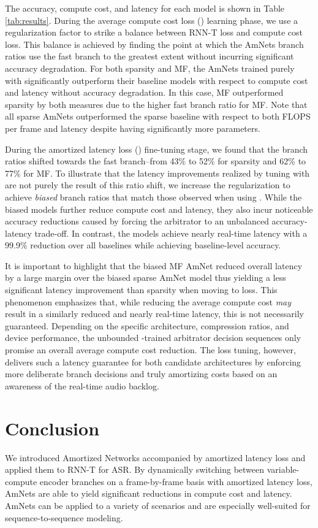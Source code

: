 \documentclass[a4paper]{article}
\begin{document}
The accuracy, compute cost, and latency for each model is shown in Table \ref{tab:results}. During the average compute cost loss () learning phase, we use a regularization factor to strike a balance between RNN-T loss and compute cost loss. This balance is achieved by finding the point at which the AmNets branch ratios use the fast branch to the greatest extent without incurring significant accuracy degradation. For both sparsity and MF, the AmNets trained purely with  significantly outperform their baseline models with respect to compute cost and latency without accuracy degradation. In this case, MF outperformed sparsity by both measures due to the higher fast branch ratio for MF. Note that all sparse AmNets outperformed the sparse baseline with respect to both FLOPS per frame and latency despite having significantly more parameters.

During the amortized latency loss () fine-tuning stage, we found that the branch ratios shifted towards the fast branch--from 43\% to 52\% for sparsity and 62\% to 77\% for MF. To illustrate that the latency improvements realized by tuning with  are not purely the result of this ratio shift, we increase the  regularization to achieve \emph{biased} branch ratios that match those observed when using . While the biased  models further reduce compute cost and latency, they also incur noticeable accuracy reductions caused by forcing the arbitrator to an unbalanced accuracy-latency trade-off. In contrast, the  models achieve nearly real-time latency with a 99.9\% reduction over all baselines while achieving baseline-level accuracy.

It is important to highlight that the biased MF  AmNet reduced overall latency by a large margin over the biased sparse AmNet model thus yielding a less significant latency improvement than sparsity when moving to  loss. This phenomenon emphasizes that, while reducing the average compute cost \emph{may} result in a similarly reduced and nearly real-time latency, this is not necessarily guaranteed. Depending on the specific architecture, compression ratios, and device performance, the unbounded -trained arbitrator decision sequences only promise an overall average compute cost reduction. The  loss tuning, however, delivers such a latency guarantee for both candidate architectures by enforcing more deliberate branch decisions and truly amortizing costs based on an awareness of the real-time audio backlog.


\section{Conclusion}
\label{sec:conclusion}
We introduced Amortized Networks accompanied by amortized latency loss and applied them to RNN-T for ASR. By dynamically switching between variable-compute encoder branches on a frame-by-frame basis with amortized latency loss, AmNets are able to yield significant reductions in compute cost and latency. AmNets can be applied to a variety of scenarios and are especially well-suited for sequence-to-sequence modeling.


\clearpage
\newpage



\end{document}
